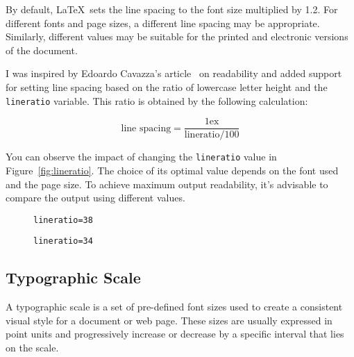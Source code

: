 \documentclass{ltugboat}
\begin{document}
{By default, \LaTeX\ sets the line spacing to the font size multiplied by 1.2.
For different fonts and page sizes, a different line spacing may be
appropriate. Similarly, different values may be suitable for the printed and
electronic versions of the document.

I was inspired by Edoardo Cavazza's article~\cite{cavazza} on readability and
added support for setting line spacing based on the ratio of lowercase letter
height and the \texttt{lineratio} variable. This ratio is obtained by the
following calculation:

\[ \text{line spacing} = \frac{1\text{ex}}{\text{lineratio}/100} \]

You can observe the impact of changing the \texttt{lineratio} value in
Figure~\ref{fig:lineratio}. The choice of its optimal value depends on the font
used and the page size. To achieve maximum output readability, it's advisable
to compare the output using different values.

\begin{figure*}[tbp]
  \begin{subfigure}[b]{0.45\textwidth}
\caption{\texttt{lineratio=38}}
\end{subfigure}
\begin{subfigure}[b]{0.45\textwidth}
\caption{\texttt{lineratio=34}}
\end{subfigure}
  \caption{Change in line spacing by changing the \texttt{lineratio} value}\label{fig:lineratio}
\end{figure*}

\subsection{Typographic Scale}

A typographic scale is a set of pre-defined font sizes used to create a
consistent visual style for a document or web page. These sizes are usually
expressed in point units and progressively increase or decrease by a specific
interval that lies on the scale.

}
\end{document}
